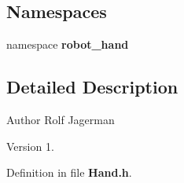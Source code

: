 \subsection*{Namespaces}
\begin{DoxyCompactItemize}
\item 
namespace {\bf robot\-\_\-hand}
\end{DoxyCompactItemize}


\subsection{Detailed Description}
\begin{DoxyAuthor}{Author}
Rolf Jagerman 
\end{DoxyAuthor}
\begin{DoxyVersion}{Version}
1. 
\end{DoxyVersion}


Definition in file {\bf Hand.\-h}.

